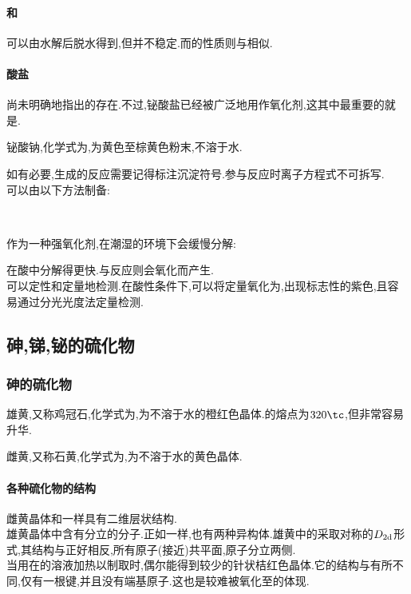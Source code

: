 \documentclass{ctexart}
\begin{document}
\paragraph{和}
可以由水解后脱水得到,但并不稳定.而的性质则与相似.
\paragraph{酸盐}
尚未明确地指出的存在.不过,铋酸盐已经被广泛地用作氧化剂,这其中最重要的就是.
\begin{substance}[\ce{NaBiO3}]
    铋酸钠,化学式为,为黄色至棕黄色粉末,不溶于水.
\end{substance}
如有必要,生成的反应需要记得标注沉淀符号.参与反应时离子方程式不可拆写.\\
\indent {}可以由以下方法制备:
\begin{center}
    \\
\end{center}
作为一种强氧化剂,在潮湿的环境下会缓慢分解:
\begin{center}
\end{center}
在酸中分解得更快.与反应则会氧化而产生.\\
\indent {}可以定性和定量地检测.在酸性条件下,可以将定量氧化为,出现标志性的紫色,且容易通过分光光度法定量检测.
\subsection{砷,锑,铋的硫化物}
\subsubsection{砷的硫化物}
\begin{substance}[\ce{As4S4}]
    雄黄,又称鸡冠石,化学式为,为不溶于水的橙红色晶体.的熔点为$320\tc$,但非常容易升华.
\end{substance}
\begin{substance}[\ce{As2S3}]
    雌黄\footnotemark,又称石黄,化学式为,为不溶于水的黄色晶体.
\end{substance}
\paragraph{各种硫化物的结构}
雌黄晶体和一样具有二维层状结构.\\
\indent 雄黄晶体中含有分立的分子.正如一样,也有两种异构体.雄黄中的采取对称的$D_{2\text d}$形式,其结构与正好相反,所有原子(接近)共平面,原子分立两侧.\\
\indent 当用在的溶液加热以制取时,偶尔能得到较少的针状桔红色晶体.它的结构与有所不同,仅有一根键,并且没有端基原子.这也是较难被氧化至的体现.
\end{document}

